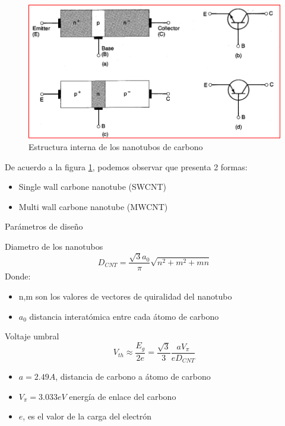 \documentclass[aspectratio=169, 8pt]{beamer}
\begin{document}
\begin{frame}
\begin{figure}[!h] 
	\centering
	\includegraphics[scale=0.7]{IMAGENES/1.PNG}
	\caption{Estructura interna de los nanotubos de carbono \cite{Prasad}}
	\label{f_4}
\end{figure}
De acuerdo a la figura \ref{f_4}, podemos observar que presenta 2 formas:
\begin{itemize}
	\item Single wall carbone nanotube (SWCNT)
	\item Multi wall carbone nanotube (MWCNT)
\end{itemize}
\end{frame}

\begin{frame}{Parámetros de diseño}
\begin{block}{Diametro de los nanotubos}
	\begin{equation}
		D_{CNT} =  \frac{\sqrt{3}a_0}{\pi}\sqrt{n^2 + m^2 + mn}
	\end{equation}
	Donde:\\
	\begin{itemize}
		\item n,m son los valores de vectores de quiralidad del nanotubo
		\item $a_0$ distancia interatómica entre cada átomo de carbono
	\end{itemize}
\end{block}
\begin{block}{Voltaje umbral}
	\begin{equation}
		V_{th}\approx \frac{E_g}{2e} = \frac{\sqrt{3}}{3}\frac{a V_{\pi}}{eD_{CNT}}
	\end{equation}
	\begin{itemize}
		\item $a= 2.49A$, distancia de carbono a átomo de carbono
		\item $V_{\pi} = 3.033eV$ energía de enlace del carbono
		\item $e$, es el valor de la carga del electrón
	\end{itemize}
\end{block}

\end{frame}
\end{document}
